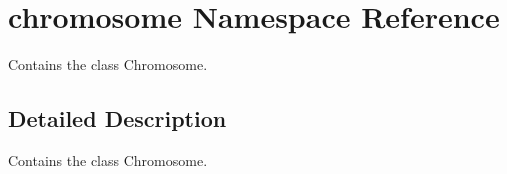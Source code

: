 \hypertarget{namespacechromosome}{}\section{chromosome Namespace Reference}
\label{namespacechromosome}


Contains the class Chromosome.  




\subsection{Detailed Description}
Contains the class Chromosome. 

